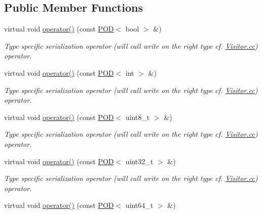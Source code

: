 \subsection*{Public Member Functions}
\begin{DoxyCompactItemize}
\item 
virtual void \hyperlink{classxtd_1_1servers_1_1param_1_1Visitor_a3f6a8a3af66864dd78e897146d6cecb5}{operator()} (const \hyperlink{classxtd_1_1servers_1_1param_1_1POD}{P\-O\-D}$<$ bool $>$ \&)
\begin{DoxyCompactList}\small\item\em Type specific serialization operator (will call write on the right type cf. \hyperlink{Visitor_8cc}{Visitor.\-cc}) operator. \end{DoxyCompactList}\item 
virtual void \hyperlink{classxtd_1_1servers_1_1param_1_1Visitor_a6c6f045ab7e39ae6361992e9c20b2902}{operator()} (const \hyperlink{classxtd_1_1servers_1_1param_1_1POD}{P\-O\-D}$<$ int $>$ \&)
\begin{DoxyCompactList}\small\item\em Type specific serialization operator (will call write on the right type cf. \hyperlink{Visitor_8cc}{Visitor.\-cc}) operator. \end{DoxyCompactList}\item 
virtual void \hyperlink{classxtd_1_1servers_1_1param_1_1Visitor_a9f900cac80adc8d63d6146335eb79e61}{operator()} (const \hyperlink{classxtd_1_1servers_1_1param_1_1POD}{P\-O\-D}$<$ uint8\-\_\-t $>$ \&)
\begin{DoxyCompactList}\small\item\em Type specific serialization operator (will call write on the right type cf. \hyperlink{Visitor_8cc}{Visitor.\-cc}) operator. \end{DoxyCompactList}\item 
virtual void \hyperlink{classxtd_1_1servers_1_1param_1_1Visitor_af83042cfb38b409a8c60c6dd74148b55}{operator()} (const \hyperlink{classxtd_1_1servers_1_1param_1_1POD}{P\-O\-D}$<$ uint32\-\_\-t $>$ \&)
\begin{DoxyCompactList}\small\item\em Type specific serialization operator (will call write on the right type cf. \hyperlink{Visitor_8cc}{Visitor.\-cc}) operator. \end{DoxyCompactList}\item 
virtual void \hyperlink{classxtd_1_1servers_1_1param_1_1Visitor_a527ddbf5eb64338a2550beb51d3db759}{operator()} (const \hyperlink{classxtd_1_1servers_1_1param_1_1POD}{P\-O\-D}$<$ uint64\-\_\-t $>$ \&)

\end{DoxyCompactItemize}
